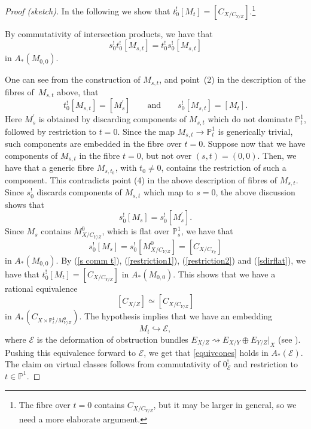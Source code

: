 \documentclass[pdftex]{sigma}
\numberwithin{equation}{section}
\newcommand{\PP}{\mathbb P}
\theoremstyle{plain}
\theoremstyle{definition}
\theoremstyle{remark}
\begin{document}
\begin{proof}[Proof (sketch)]
In the following we show that $t_0^![M_t]=[C_{X/C_{Y/Z}}]$.\footnote{The fibre over $t=0$ contains $C_{X/C_{Y/Z}}$, but it may be larger in general, so we need a more elaborate argument.}

By commutativity of intersection products, we have that
\begin{equation}\label{s comm t} s_0^!t^!_0[M_{s,t}] =t_0^!s^!_0[M_{s,t}]
\end{equation}
in $A_*(M_{0,0})$.

One can see from the construction of $M_{s,t}$, and point~(2) in the description of the fibres of~$M_{s,t}$ above, that
\begin{equation}\label{restriction1}t^!_0[M_{s,t}]=[M^{\prime}_s] \qquad \text{and} \qquad s^!_0[M_{s,t}]=[M_t].
\end{equation}
Here $M^{\prime}_s$ is obtained by discarding components of $M_{s,t}$ which do not dominate $\PP^1_t$, followed by restriction to $t=0$. Since the map $M_{s,t}\to\PP^1_t$ is generically trivial, such components are embedded in the fibre over $t=0$. Suppose now that we have components of $M_{s,t}$ in the fibre $t=0$, but not over $(s,t)=(0,0)$. Then, we have that a generic fibre $M_{s,t_0}$, with $t_0\neq 0$, contains the restriction of such a component. This contradicts point (4) in the above description of fibres of $M_{s,t}$. Since $s_0^!$ discards components of $M_{s,t}$ which map to $s=0$, the above discussion shows that
\begin{equation}\label{restriction2}s^!_0[M_s]=s^!_0[M^{\prime}_s].
\end{equation}
Since $M_s$ contains $M^0_{X/C_{Y/Z}}$, which is flat over $\PP^1_s$, we have that
\begin{equation}\label{sdirflat}s^!_0[M_s] =s^!_0[M^0_{X/C_{Y/Z}}]=[C_{X/C_{Y_Z}}]
\end{equation}
in $A_*(M_{0,0})$.
\noindent By (\ref{s comm t}), (\ref{restriction1}), (\ref{restriction2}) and (\ref{sdirflat}), we have that $t_0^![M_t]=[C_{X/C_{Y/Z}}]$ in $A_*(M_{0,0})$. This shows that we have a rational equivalence
\begin{equation}\label{equivcones}[C_{X/Z}]\simeq [C_{X/C_{Y/Z}}]
\end{equation}
in $A_*(C_{X\times\PP^1_t/M^0_{Y/Z}})$.
The hypothesis implies that we have an embedding
\[
M_t\hookrightarrow \mathcal{E},
\]
where $\mathcal{E}$ is the deformation of obstruction bundles $E_{X/Z}\rightsquigarrow E_{X/Y}\oplus E_{Y/Z}\rvert _X$ (see \cite{KKP}).
Pushing this equivalence forward to $\mathcal{E}$, we get that \eqref{equivcones} holds in $A_*(\mathcal{E})$. The claim on virtual classes follows from commutativity of $0^!_{\mathcal E}$ and restriction to $t\in\PP^1$.
\end{proof}
\end{document}
